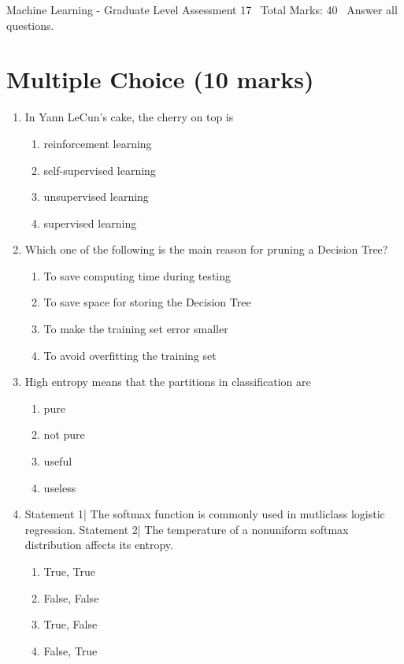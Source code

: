 \documentclass[12pt]{article}
\begin{document}
\begin{center}
Machine Learning - Graduate Level Assessment 17 \
Total Marks: 40 \
Answer all questions.
\end{center}

\section*{Multiple Choice (10 marks)}
\begin{enumerate}[label=\arabic*.]
\item In Yann LeCun's cake, the cherry on top is
\begin{enumerate}[label=(\alph*)]
    \item reinforcement learning
    \item self-supervised learning
    \item unsupervised learning
    \item supervised learning
\end{enumerate}
\item Which one of the following is the main reason for pruning a Decision Tree?
\begin{enumerate}[label=(\alph*)]
    \item To save computing time during testing
    \item To save space for storing the Decision Tree
    \item To make the training set error smaller
    \item To avoid overfitting the training set
\end{enumerate}
\item High entropy means that the partitions in classification are
\begin{enumerate}[label=(\alph*)]
    \item pure
    \item not pure
    \item useful
    \item useless
\end{enumerate}
\item Statement 1| The softmax function is commonly used in mutliclass logistic regression. Statement 2| The temperature of a nonuniform softmax distribution affects its entropy.
\begin{enumerate}[label=(\alph*)]
    \item True, True
    \item False, False
    \item True, False
    \item False, True

\end{enumerate}
\end{enumerate}
\end{document}
